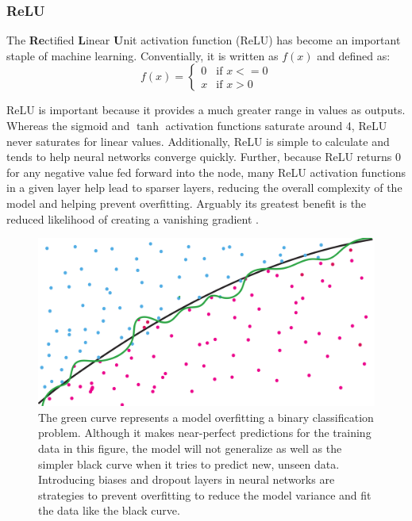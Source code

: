 \subsubsection{ReLU}
The \textbf{Re}ctified \textbf{L}inear \textbf{U}nit activation function (ReLU) has become an important staple of machine learning. Conventially, it is written as $ f(x) $ and defined as:
\begin{equation}
f(x)=
\begin{cases}
    0 & \text{if } x <= 0 \\
    x & \text{if } x > 0
\end{cases}
\end{equation}

\noindent ReLU is important because it provides a much greater range in values as outputs. Whereas the sigmoid and $\tanh$ activation functions saturate around 4, ReLU never saturates for linear values. Additionally, ReLU is simple to calculate and tends to help neural networks converge quickly. Further, because ReLU returns 0 for any negative value fed forward into the node, many ReLU activation functions in a given layer help lead to sparser layers, reducing the overall complexity of the model and helping prevent overfitting. Arguably its greatest benefit is the reduced likelihood of creating a vanishing gradient \cite{orig-relu}. 


\begin{figure}[h]
    \centering
    \includegraphics[width=\linewidth]{Chapters/Figures/overfittingOrig2.pdf}
    \caption[Overfitting]{The green curve represents a model overfitting a binary classification problem. Although it makes near-perfect predictions for the training data in this figure, the model will not generalize as well as the simpler black curve when it tries to predict new, unseen data. Introducing biases and dropout layers in neural networks are strategies to prevent overfitting to reduce the model variance and fit the data like the black curve.}
    \label{fig:overfitting}
\end{figure}


